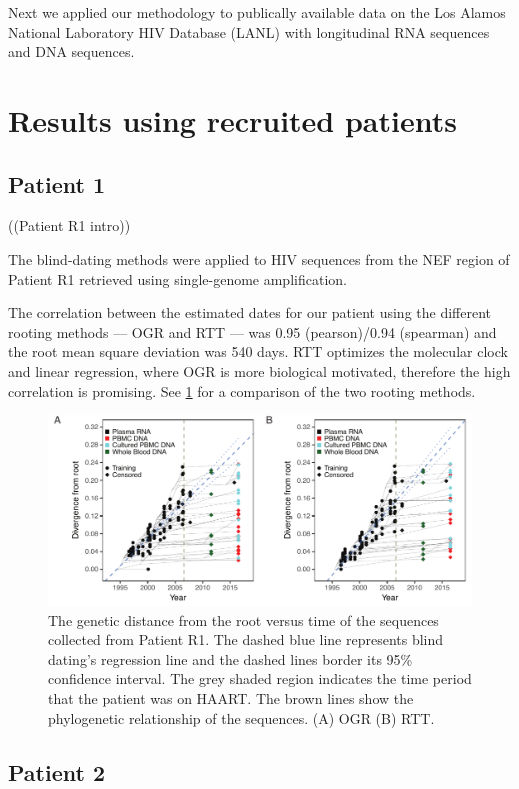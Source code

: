 \documentclass[12pt,onecolumn,twoside]{pnas-new}
\begin{document}
Next we applied our methodology to publically available data on the Los Alamos National Laboratory HIV Database (LANL) with longitudinal RNA sequences and DNA sequences.


\section{Results using recruited patients}

\subsection*{Patient 1}
((Patient R1 intro))

The blind-dating methods were applied to HIV sequences from the NEF region of Patient R1 retrieved using single-genome amplification.

The correlation between the estimated dates for our patient using the different rooting methods --- OGR and RTT --- was 0.95 (pearson)/0.94 (spearman) and the root mean square deviation was 540 days.
RTT optimizes the molecular clock and linear regression, where OGR is more biological motivated, therefore the high correlation is promising.
See \cref{fig:pat1} for a comparison of the two rooting methods.

\begin{figure}
\includegraphics{nefdistvtime}
\caption{The genetic distance from the root versus time of the sequences collected from Patient R1.
The dashed blue line represents blind dating's regression line and the dashed lines border its 95\% confidence interval.
The grey shaded region indicates the time period that the patient was on HAART.
The brown lines show the phylogenetic relationship of the sequences.
(A) OGR (B) RTT.}
\label{fig:pat1}
\end{figure}

\subsection{Patient 2}
\end{document}
